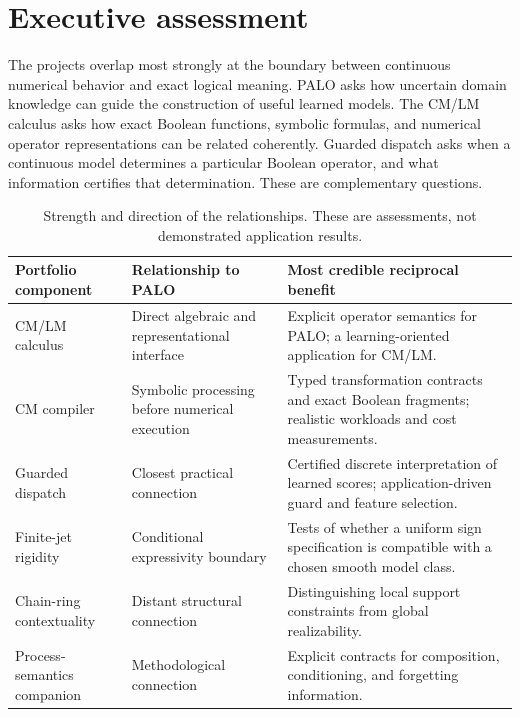 \documentclass[11pt,a4paper]{article}
\theoremstyle{remark}
\begin{document}
\section{Executive assessment}
The projects overlap most strongly at the boundary between continuous numerical behavior and exact logical meaning. PALO asks how uncertain domain knowledge can guide the construction of useful learned models. The CM/LM calculus asks how exact Boolean functions, symbolic formulas, and numerical operator representations can be related coherently. Guarded dispatch asks when a continuous model determines a particular Boolean operator, and what information certifies that determination. These are complementary questions.

\begin{table}[htbp]
\centering\small
\begin{tabularx}{\textwidth}{@{}P{31mm}YY@{}}
\toprule
Portfolio component & Relationship to PALO & Most credible reciprocal benefit\\
\midrule
CM/LM calculus & Direct algebraic and representational interface & Explicit operator semantics for PALO; a learning-oriented application for CM/LM.\\
CM compiler & Symbolic processing before numerical execution & Typed transformation contracts and exact Boolean fragments; realistic workloads and cost measurements.\\
Guarded dispatch & Closest practical connection & Certified discrete interpretation of learned scores; application-driven guard and feature selection.\\
Finite-jet rigidity & Conditional expressivity boundary & Tests of whether a uniform sign specification is compatible with a chosen smooth model class.\\
Chain-ring contextuality & Distant structural connection & Distinguishing local support constraints from global realizability.\\
Process-semantics companion & Methodological connection & Explicit contracts for composition, conditioning, and forgetting information.\\
\bottomrule
\end{tabularx}
\caption{Strength and direction of the relationships. These are assessments, not demonstrated application results.}
\end{table}
\end{document}
